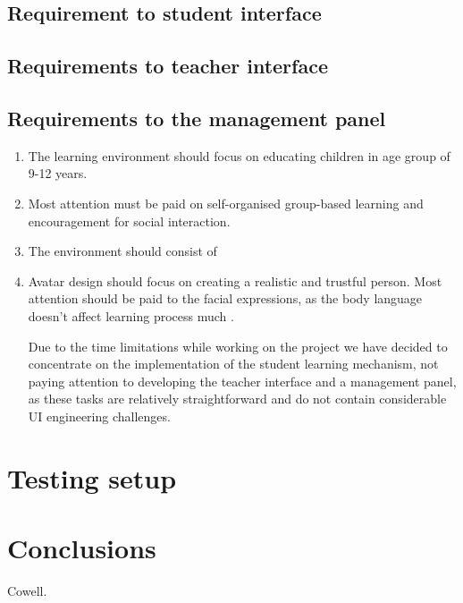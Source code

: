 \documentclass[a4paper]{article}
\begin{document}
\subsection{Requirement to student interface}

\subsection{Requirements to teacher interface}

\subsection{Requirements to the management panel}

\begin{enumerate}
\item The learning environment should focus on educating children in age group of 9-12 years.
\item Most attention must be paid on self-organised group-based learning and encouragement for social interaction.
\item The environment should consist of 
\item Avatar design should focus on creating a realistic and trustful person. Most attention should be paid to the facial expressions, as the body language doesn't affect learning process much \cite{Cowell}.

Due to the time limitations while working on the project we have decided to concentrate on the implementation of the student learning mechanism, not paying attention to developing the teacher interface and a management panel, as these tasks are relatively straightforward and do not contain considerable UI engineering challenges. 


\end{enumerate}


\section{Testing setup}

\section{Conclusions}

\begin{thebibliography}{99}
 Cowell.
\end{thebibliography}
\end{document}
